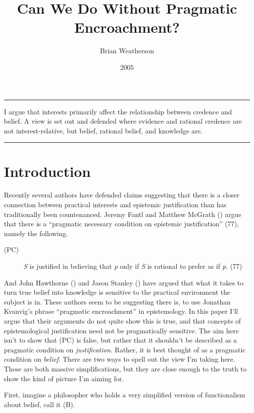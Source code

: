 \documentclass[
  10pt,
  letterpaper,
  DIV=11,
  numbers=noendperiod,
  twoside]{scrartcl}
\title{Can We Do Without Pragmatic Encroachment?}
\author{Brian Weatherson}
\date{2005}
\renewenvironment{abstract}
 {\vspace{-1.25cm}
 \quotation\small\noindent\rule{\linewidth}{.5pt}\par\smallskip
 \noindent }
 {\par\noindent\rule{\linewidth}{.5pt}\endquotation}
\begin{document}
\maketitle
\begin{abstract}
I argue that interests primarily affect the relationship between
credence and belief. A view is set out and defended where evidence and
rational credence are not interest-relative, but belief, rational
belief, and knowledge are.
\end{abstract}


\section{Introduction}\label{introduction}

Recently several authors have defended claims suggesting that there is a
closer connection between practical interests and epistemic
justification than has traditionally been countenanced. Jeremy Fantl and
Matthew McGrath () argue that there is a
``pragmatic necessary condition on epistemic justification'' (77),
namely the following.

\begin{description}
\item[(PC)]
\emph{S} is justified in believing that \emph{p} only if \emph{S} is
rational to prefer as if \emph{p}. (77)
\end{description}

And John Hawthorne () and Jason
Stanley () have argued that what
it takes to turn true belief into knowledge is sensitive to the
practical environment the subject is in. These authors seem to be
suggesting there is, to use Jonathan Kvanvig's phrase ``pragmatic
encroachment'' in epistemology. In this paper I'll argue that their
arguments do not quite show this is true, and that concepts of
epistemological justification need not be pragmatically sensitive. The
aim here isn't to show that (PC) is false, but rather that it shouldn't
be described as a pragmatic condition on \emph{justification}. Rather,
it is best thought of as a pragmatic condition on \emph{belief}. There
are two ways to spell out the view I'm taking here. These are both
massive simplifications, but they are close enough to the truth to show
the kind of picture I'm aiming for.

First, imagine a philosopher who holds a very simplified version of
functionalism about belief, call it (B).
\end{document}
